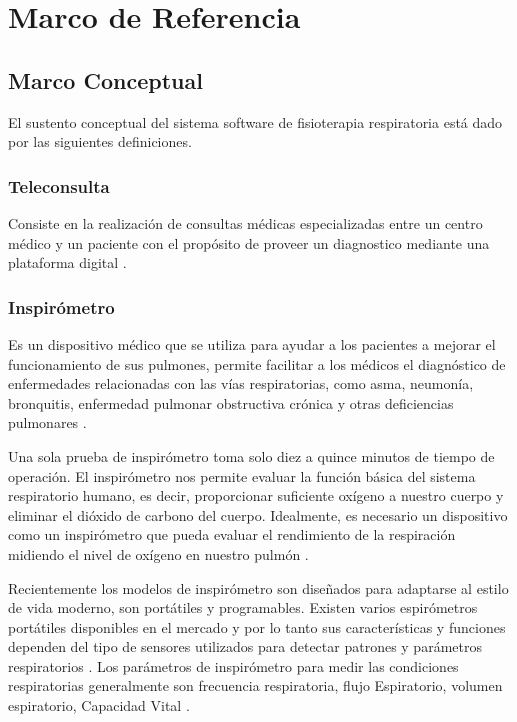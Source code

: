 \documentclass[12pt]{article}
\begin{document}
\section{Marco de Referencia}


\subsection{Marco Conceptual} 
El sustento conceptual del sistema software de fisioterapia respiratoria está dado por las siguientes definiciones.


\subsubsection{Teleconsulta}
Consiste en la realización de consultas médicas especializadas entre un centro médico y un paciente con el propósito de proveer un diagnostico mediante una plataforma digital \cite{25}.

\subsubsection{Inspirómetro}

Es un dispositivo médico que se utiliza para ayudar a los pacientes a mejorar el funcionamiento de sus pulmones, permite facilitar a los médicos el diagnóstico de enfermedades relacionadas con las vías respiratorias, como asma, neumonía, bronquitis, enfermedad pulmonar obstructiva crónica y otras deficiencias pulmonares \cite{22}. 

Una sola prueba de inspirómetro toma solo diez a quince minutos de tiempo de operación. El inspirómetro nos permite evaluar la función básica del sistema respiratorio humano, es decir, proporcionar suficiente oxígeno a nuestro cuerpo y eliminar el dióxido de carbono del cuerpo. Idealmente, es necesario un dispositivo como un inspirómetro que pueda evaluar el rendimiento de la respiración midiendo el nivel de oxígeno en nuestro pulmón \cite{22}.

Recientemente los modelos de inspirómetro son diseñados para adaptarse al estilo de vida moderno, son portátiles y programables. Existen varios espirómetros portátiles disponibles en el mercado y por lo tanto sus características y funciones dependen del tipo de sensores utilizados para detectar patrones y parámetros respiratorios \cite{23}\cite{24}. Los parámetros de inspirómetro para medir las condiciones respiratorias generalmente son frecuencia respiratoria, flujo Espiratorio, volumen espiratorio, Capacidad Vital \cite{22}.
\end{document}
